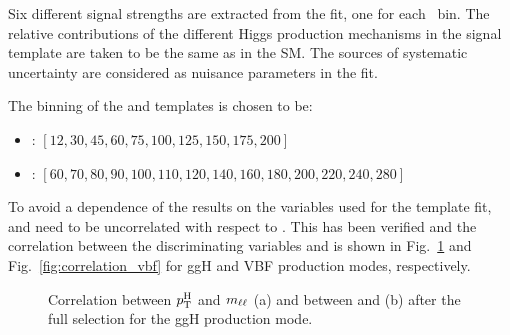 Six different signal strengths are extracted from the fit, one for each \pth~bin. The relative contributions of the different Higgs production mechanisms in the signal template are taken to be the same as in the SM. The sources of systematic uncertainty are considered as nuisance parameters in the fit.

The binning of the \mll and \mt templates is chosen to be:
\begin{itemize}
\item {\mll: $[12,30,45,60,75,100,125,150,175,200]$} 
\item {\mt: $[60,70,80,90,100,110,120,140,160,180,200,220,240,280]$}
\end{itemize}

To avoid a dependence of the results on the variables used for the template fit, \mll and \mt need to be uncorrelated with respect to \pth.
This has been verified and the correlation between the discriminating variables and \pth is shown in Fig.~\ref{fig:correlation_ggH} and Fig.~\ref{fig:correlation_vbf} for ggH and VBF production modes, respectively.

\begin{figure}[htb]
\centering
{}
\caption{Correlation between $p_\mathrm{T}^\mathrm{H}$ and $m_{\ell\ell}$ (a) and between \pth and \mt (b) after the full selection for the ggH production mode.\label{fig:correlation_ggH}}
\end{figure}


